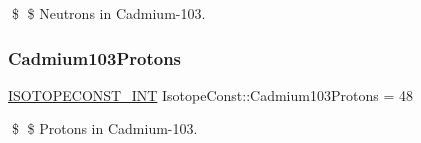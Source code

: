 \$ \$ Neutrons in Cadmium-\/103. \mbox{\label{group___isotope_const-_cadmium-_cd103_ga475163eb3cea3dfbbf3f6a34812d2be4}} 
\subsubsection{\texorpdfstring{Cadmium103\+Protons}{Cadmium103Protons}}
{\footnotesize\ttfamily \mbox{\hyperlink{group___isotope_const-_macros_ga5f18360b3e99483a35c32d789e62621c}{I\+S\+O\+T\+O\+P\+E\+C\+O\+N\+S\+T\+\_\+\+I\+NT}} Isotope\+Const\+::\+Cadmium103\+Protons = 48}

\$ \$ Protons in Cadmium-\/103. 